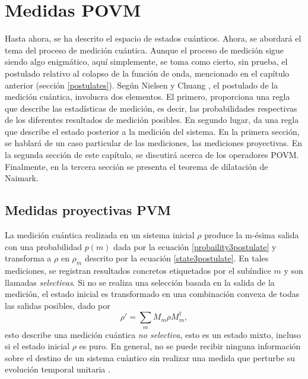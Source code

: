 \chapter{Medidas POVM}\label{MedidaPOVM}
Hasta ahora, se ha descrito el espacio de estados cuánticos. Ahora, se abordará el tema del proceso de medición cuántica. Aunque el proceso de medición  sigue siendo algo enigmático, aquí simplemente, se toma como cierto, sin prueba, el postulado relativo al colapso de la función de onda, mencionado en el capítulo anterior (sección {\ref{postulates}}). Según Nielsen y Chuang {\cite{nielsen_chuang_2010}}, el postulado de la medición cuántica, involucra dos elementos. El primero, proporciona una regla que describe las estadísticas de medición, es decir, las probabilidades respectivas de los diferentes resultados de medición posibles. En segundo lugar, da una regla que describe el estado posterior a la medición del sistema.  En la primera sección, se hablará de un caso particular de las mediciones, las mediciones proyectivas. En la segunda sección de este capítulo, se discutirá acerca de los operadores POVM\@. Finalmente, en la tercera sección se presenta el teorema de dilatación de Naimark. 











\section{Medidas proyectivas PVM}
La medición cuántica realizada en un sistema inicial $\rho$ produce  la m-ésima salida con una probabilidad $p(m)$ dada por la ecuación {\ref{probaility3postulate}} y transforma a $\rho $ en $\rho_m$ descrito por la ecuación {\ref{state3postulate}}. En tales mediciones, se registran resultados concretos etiquetados por el subíndice $m$ y son llamadas \textit{selectivas}. Si no se realiza una selección basada en la salida de la medición, el estado inicial es transformado en una combinación convexa de todas las salidas posibles, dado por 
\begin{equation}\label{non-selective-measure}
	\rho'=\sum_m M_m\rho M_m^\dagger,
\end{equation}
esto describe una medición cuántica \textit{no selectiva}, esto es un estado mixto, incluso si el estado inicial $\rho$ es puro. En general, no se puede recibir ninguna información sobre el destino de un sistema cuántico sin realizar una medida que perturbe su evolución temporal unitaria {\cite{2007geometry}}.

